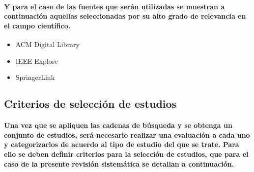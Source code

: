 \documentclass[10pt, twocolumn]{article}
\begin{document}
\paragraph{Y para el caso de las fuentes que serán utilizadas se muestran a continuación aquellas seleccionadas por su alto grado de relevancia en el campo científico.}
\begin{itemize}
	\item{ACM Digital Library}
	\item{IEEE Explore}
	\item{SpringerLink}
\end{itemize}

\subsection{Criterios de selección de estudios}
\paragraph{Una vez que se apliquen las cadenas de búsqueda y se obtenga un conjunto de estudios, será necesario realizar una evaluación a cada uno y categorizarlos de acuerdo al tipo de estudio del que se trate. Para ello se deben definir criterios para la selección de estudios, que para el caso de la presente revisión sistemática se detallan a continuación.}
\end{document}
